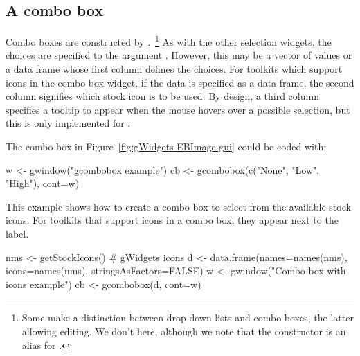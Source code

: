 
\subsection{A combo box}
\label{sec:gWidgets-combobox}

Combo boxes are constructed by .~\footnote{Some
  make a distinction between drop down lists and combo boxes, the
  latter allowing editing. We don't here, although we note that the
  constructor  is an alias for
  .}  As with the other selection widgets, the choices
  are specified to the argument . However,
  this may be a vector of values or a data frame whose first column
  defines the choices. For toolkits which support icons in the combo
  box widget, if the data is specified as a data frame, the second
  column signifies which stock icon is to be used. By design, a third
  column specifies a tooltip to appear when the mouse hovers over a
  possible selection, but this is only implemented for
  .


The combo box in Figure~\ref{fig:gWidgets-EBImage-gui} could be coded with:
\begin{Schunk}
\begin{Sinput}
 w <- gwindow("gcombobox example")
 cb <- gcombobox(c("None", "Low", "High"), cont=w)
\end{Sinput}
\end{Schunk}



This example shows how to create a combo box to select from the
available stock icons. For toolkits that support icons in a combo box, they
appear next to the label.
\begin{Schunk}
\begin{Sinput}
 nms <- getStockIcons()                  # gWidgets icons
 d <- data.frame(names=names(nms), icons=names(nms), 
                 stringsAsFactors=FALSE)
 w <- gwindow("Combo box with icons example")
 cb <- gcombobox(d, cont=w)
\end{Sinput}
\end{Schunk}


